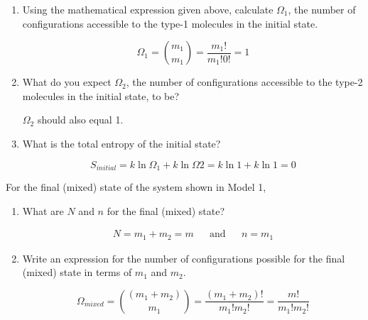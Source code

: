 \begin{activity}
\begin{ctqs}
\begin{enumerate}
				\item Using the mathematical expression given above, calculate $\Omega_1$, the number of configurations accessible to the type-1 molecules in the initial state.
				
					\begin{solution}[0.75in]
						\begin{equation*}
							\Omega_1 = {m_1 \choose m_1} = \frac{m_1!}{m_1! 0!} = 1
						\end{equation*}
					\end{solution}
				
				\item What do you expect $\Omega_2$, the number of configurations accessible to the type-2 molecules in the initial state, to be?
				
					\begin{solution}[0.75in]
						$\Omega_2$ should also equal 1.
					\end{solution}
					
				\item What is the total entropy of the initial state?
					
					\begin{solution}[1in]
						\begin{equation*}
						S_{initial} = k \ln \Omega_1 + k \ln \Omega 2 = k \ln 1 + k \ln 1 = 0
						\end{equation*}
					\end{solution}
			\end{enumerate}
		
		\question For the final (mixed) state of the system shown in Model 1, 
			\begin{enumerate}
				\item What are $N$ and $n$ for the final (mixed) state?
				
					\begin{solution}[0.75in]
						\begin{align*}
							N = m_1+m_2=m && \text{and} && n = m_1
						\end{align*}
					\end{solution}
					
				\item Write an expression for the number of configurations possible for the final (mixed) state in terms of $m_1$ and $m_2$.
				
					\begin{solution}[1in]
						\begin{equation*}
							\Omega_{mixed} = {(m_1+m_2) \choose m_1} = \frac{(m_1+m_2)!}{m_1! m_2!} = \frac{m!}{m_1! m_2!}
						\end{equation*}
					\end{solution}
					

\end{enumerate}
\end{ctqs}
\end{activity}
